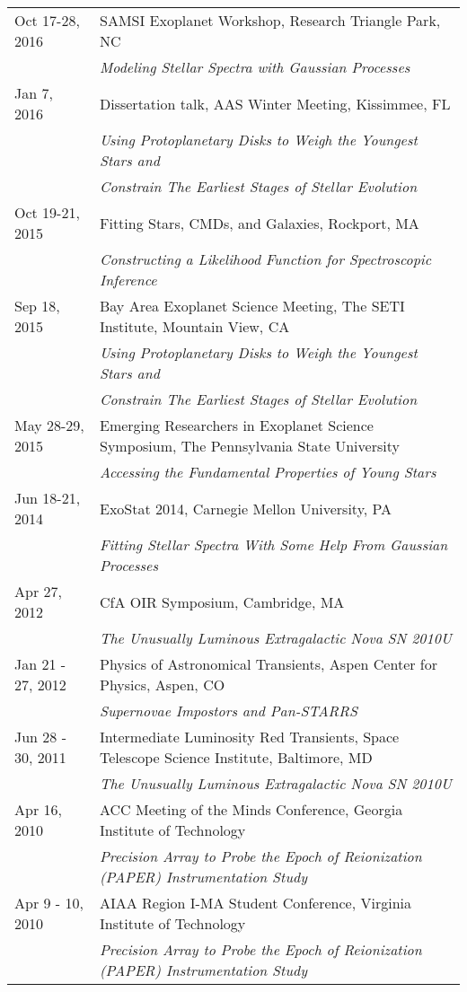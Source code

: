 \documentclass[10pt]{article}
\newcommand{\rowskip}{1.2mm}
\begin{document}
\begin{tabular*}{\textwidth}{@{\hspace{10pt}}p{1.2in}l}
  Oct 17-28, 2016 & SAMSI Exoplanet Workshop, Research Triangle Park, NC\\
  & \emph{Modeling Stellar Spectra with Gaussian Processes} \\[\rowskip]
  Jan 7, 2016 & Dissertation talk, AAS Winter Meeting, Kissimmee, FL \\
  & \emph{Using Protoplanetary Disks to Weigh the Youngest Stars and} \\
  & \emph{Constrain The Earliest Stages of Stellar Evolution} \\[\rowskip]
  Oct 19-21, 2015 & Fitting Stars, CMDs, and Galaxies, Rockport, MA \\
  & \emph{Constructing a Likelihood Function for Spectroscopic Inference}\\[\rowskip]
  Sep 18, 2015 & Bay Area Exoplanet Science Meeting, The SETI Institute, Mountain View, CA \\
  & \emph{Using Protoplanetary Disks to Weigh the Youngest Stars and} \\
  & \emph{Constrain The Earliest Stages of Stellar Evolution} \\[\rowskip]
  May 28-29, 2015 & Emerging Researchers in Exoplanet Science Symposium, The Pennsylvania State University\\
  & \emph{Accessing the Fundamental Properties of Young Stars} \\[\rowskip]
  Jun 18-21, 2014 & ExoStat 2014, Carnegie Mellon University, PA \\
  & \emph{Fitting Stellar Spectra With Some Help From Gaussian Processes} \\[\rowskip]
  Apr 27, 2012 & CfA OIR Symposium, Cambridge, MA \\
  & \emph{The Unusually Luminous Extragalactic Nova SN 2010U}\\
  Jan 21 - 27, 2012 & Physics of Astronomical Transients, Aspen Center for Physics, Aspen, CO \\
  & \emph{Supernovae Impostors and Pan-STARRS} \\[\rowskip]
  Jun 28 - 30, 2011 & Intermediate Luminosity Red Transients, Space Telescope Science Institute, Baltimore, MD\\
  & \emph{The Unusually Luminous Extragalactic Nova SN 2010U} \\[\rowskip]
  Apr 16, 2010 & ACC Meeting of the Minds Conference, Georgia Institute of Technology \\
  & \emph{Precision Array to Probe the Epoch of Reionization (PAPER) Instrumentation Study} \\[\rowskip]
  Apr 9 - 10, 2010 &  AIAA Region I-MA Student Conference, Virginia Institute of Technology\\
  & \emph{Precision Array to Probe the Epoch of Reionization (PAPER) Instrumentation Study} \\[\rowskip]
\end{tabular*}
\end{document}

